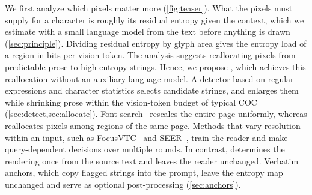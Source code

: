 We first analyze which pixels matter more (\cref{fig:teaser}).
What the pixels must supply for a character is roughly its residual entropy given the context, which we estimate with a small language model from the text before anything is drawn (\cref{sec:principle}).
Dividing residual entropy by glyph area gives the entropy load of a region in bits per vision token.
The analysis suggests reallocating pixels from predictable prose to high-entropy strings. Hence, we propose \name, which achieves this reallocation without an auxiliary language model. A detector based on regular expressions and character statistics selects candidate strings, and \name enlarges them while shrinking prose within the vision-token budget of typical COC (\cref{sec:detect,sec:allocate}).
Font search~\cite{cheng2025glyph} rescales the entire page uniformly, whereas \name reallocates pixels among regions of the same page. Methods that vary resolution within an input, such as FocusVTC~\cite{zhong2026focusvtc} and SEER~\cite{xu2026seer}, train the reader and make query-dependent decisions over multiple rounds. In contrast, \name determines the rendering once from the source text and leaves the reader unchanged. Verbatim anchors, which copy flagged strings into the prompt, leave the entropy map unchanged and serve as optional post-processing (\cref{sec:anchors}).

